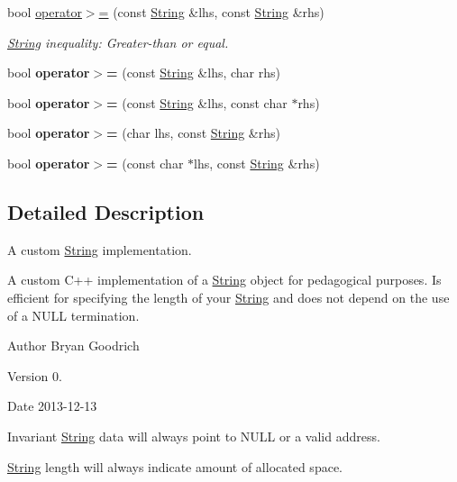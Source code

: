 {\bf }\par
\begin{DoxyCompactItemize}
\item 
bool \hyperlink{classString_a8aaac987f17f693b727f6f61c82ef59d}{operator$>$=} (const \hyperlink{classString}{String} \&lhs, const \hyperlink{classString}{String} \&rhs)
\begin{DoxyCompactList}\small\item\em \hyperlink{classString}{String} inequality\-: Greater-\/than or equal. \end{DoxyCompactList}\item 
\hypertarget{classString_a5613f8f396ca5992d592745e1a5bd3ad}{bool {\bfseries operator$>$=} (const \hyperlink{classString}{String} \&lhs, char rhs)}\label{classString_a5613f8f396ca5992d592745e1a5bd3ad}

\item 
\hypertarget{classString_adce2f798f94879309cef872d5c0cf70c}{bool {\bfseries operator$>$=} (const \hyperlink{classString}{String} \&lhs, const char $\ast$rhs)}\label{classString_adce2f798f94879309cef872d5c0cf70c}

\item 
\hypertarget{classString_af610fc0bd52cb2d8556382c3037dfdc0}{bool {\bfseries operator$>$=} (char lhs, const \hyperlink{classString}{String} \&rhs)}\label{classString_af610fc0bd52cb2d8556382c3037dfdc0}

\item 
\hypertarget{classString_a5415fd0bce16fb23ec98e50c0b82b42e}{bool {\bfseries operator$>$=} (const char $\ast$lhs, const \hyperlink{classString}{String} \&rhs)}\label{classString_a5415fd0bce16fb23ec98e50c0b82b42e}

\end{DoxyCompactItemize}



\subsection{Detailed Description}
A custom \hyperlink{classString}{String} implementation. 

A custom C++ implementation of a \hyperlink{classString}{String} object for pedagogical purposes. Is efficient for specifying the length of your \hyperlink{classString}{String} and does not depend on the use of a N\-U\-L\-L termination.

\begin{DoxyAuthor}{Author}
Bryan Goodrich 
\end{DoxyAuthor}
\begin{DoxyVersion}{Version}
0. 
\end{DoxyVersion}
\begin{DoxyDate}{Date}
2013-\/12-\/13 
\end{DoxyDate}
\begin{DoxyInvariant}{Invariant}
\hyperlink{classString}{String} data will always point to N\-U\-L\-L or a valid address. 

\hyperlink{classString}{String} length will always indicate amount of allocated space. 
\end{DoxyInvariant}


